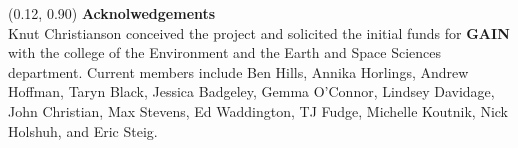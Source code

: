 \documentclass[landscape]{uwposter}
\begin{document}
\begin{frame}
\begin{textblock}{0.76}(0.12, 0.90)
    \color{white}
    \sffamily
    \textbf{Acknolwedgements}
    \\
    Knut Christianson conceived the project and solicited the initial funds for \textbf{\alert{GAIN}} with the college of the Environment and the Earth and Space Sciences department.  
    Current members include Ben Hills, Annika Horlings, Andrew Hoffman, Taryn Black, Jessica Badgeley, Gemma O'Connor, Lindsey Davidage, John Christian,  Max Stevens, Ed Waddington, TJ Fudge, Michelle Koutnik, Nick Holshuh, and Eric Steig.
    \end{textblock}


\end{frame}
\end{document}
